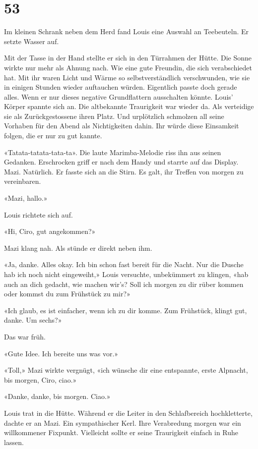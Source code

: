 \chapter{53}



Im kleinen Schrank neben dem Herd fand Louis eine Auswahl an Teebeuteln.
Er setzte Wasser auf. 

Mit der Tasse in der Hand stellte er sich in den
Türrahmen der Hütte. Die Sonne wirkte nur mehr als Ahnung nach. Wie eine gute Freundin, die sich
verabschiedet hat. Mit ihr waren Licht und Wärme so
selbstverständlich verschwunden, wie sie in einigen Stunden wieder auftauchen würden.
Eigentlich passte doch gerade alles. Wenn er nur dieses negative
Grundflattern ausschalten könnte. Louis’ Körper spannte sich an. Die
altbekannte Traurigkeit war wieder da. Als verteidige sie als
Zurückgestossene ihren Platz. Und urplötzlich schmolzen all seine Vorhaben für den Abend 
als Nichtigkeiten dahin. Ihr würde diese Einsamkeit folgen,
die er nur zu gut kannte.

«Tatata-tatata-tata-ta». Die laute Marimba-Melodie riss ihn aus seinen
Gedanken. Erschrocken griff er nach dem Handy und starrte auf das
Display. Mazi. Natürlich. Er fasste sich an die Stirn. Es galt, ihr
Treffen von morgen zu vereinbaren.

«Mazi, hallo.»

Louis richtete sich auf.

«Hi, Ciro, gut angekommen?»

Mazi klang nah. Als stünde er direkt neben ihm.

«Ja, danke. Alles okay. Ich bin schon fast bereit für die Nacht. Nur die
Dusche hab ich noch nicht eingeweiht,» Louis versuchte, unbekümmert zu
klingen, «hab auch an dich gedacht, wie machen wir’s? Soll ich morgen zu
dir rüber kommen oder kommst du zum Frühstück zu mir?»

«Ich glaub, es ist einfacher, wenn ich zu dir komme. Zum Frühstück,
klingt gut, danke. Um sechs?»

Das war früh.

«Gute Idee. Ich bereite uns was vor.»

«Toll,» Mazi wirkte vergnügt, «ich wünsche dir eine entspannte, erste
Alpnacht, bis morgen, Ciro, ciao.»

«Danke, danke, bis morgen. Ciao.»

Louis trat in die Hütte.
Während er die Leiter in den Schlafbereich hochkletterte, dachte er an
Mazi. Ein sympathischer Kerl. Ihre Verabredung morgen war ein
willkommener Fixpunkt. Vielleicht sollte er seine Traurigkeit einfach in
Ruhe lassen.

